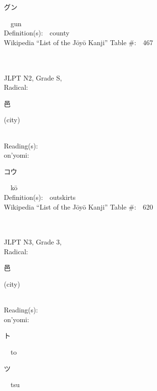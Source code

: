 \begin{multicols}{2}
{\hspace*{2em}}{\begin{CJK}{UTF8}{min} グン \end{CJK}}\ \ gun\ \ \\
Definition(s):\ \ county \\
Wikipedia ``List of the J\=oy\=o Kanji'' Table \#:\ \ 467 \\
\ \ \\
{\fontsize{34pt}{40pt}  }\ \ \\  %
{JLPT N2, Grade S, \\Radical:\ \ {\begin{CJK}{UTF8}{min} 邑 \end{CJK}} (city) } \\
Reading(s):\ \ \\
{\hspace*{1em}}on'yomi:\ \ \\
{\hspace*{2em}}{\begin{CJK}{UTF8}{min} コウ \end{CJK}}\ \ k\=o\ \ \\
Definition(s):\ \ outskirts \\
Wikipedia ``List of the J\=oy\=o Kanji'' Table \#:\ \ 620 \\
\ \ \\
{\fontsize{34pt}{40pt}  }\ \ \\  %
{JLPT N3, Grade 3, \\Radical:\ \ {\begin{CJK}{UTF8}{min} 邑 \end{CJK}} (city) } \\
Reading(s):\ \ \\
{\hspace*{1em}}on'yomi:\ \ \\
{\hspace*{2em}}{\begin{CJK}{UTF8}{min} ト \end{CJK}}\ \ to\ \ \\
{\hspace*{2em}}{\begin{CJK}{UTF8}{min} ツ \end{CJK}}\ \ tsu\ \ \\

\end{multicols}
